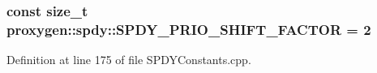 \subsubsection[{S\+P\+D\+Y\+\_\+\+P\+R\+I\+O\+\_\+\+S\+H\+I\+F\+T\+\_\+\+F\+A\+C\+T\+OR}]{\setlength{\rightskip}{0pt plus 5cm}const size\+\_\+t proxygen\+::spdy\+::\+S\+P\+D\+Y\+\_\+\+P\+R\+I\+O\+\_\+\+S\+H\+I\+F\+T\+\_\+\+F\+A\+C\+T\+OR = 2}\label{namespaceproxygen_1_1spdy_ab08cb56e5c6b8971b83d060b212ab2e0}


Definition at line 175 of file S\+P\+D\+Y\+Constants.\+cpp.


